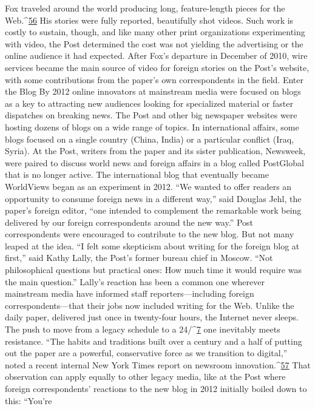 Fox traveled around the world producing long, feature-length pieces for the Web.^{\href{#endnotes}{56}} His
stories were fully reported, beautifully shot videos. Such work is costly to sustain,
though, and like many other print organizations experimenting with video, the Post
determined the cost was not yielding the advertising or the online audience it had
expected. After Fox’s departure in December of 2010, wire services became the main
source of video for foreign stories on the Post’s website, with some contributions from
the paper’s own correspondents in the field.
Enter the Blog
By 2012 online innovators at mainstream media were focused on blogs as a key to
attracting new audiences looking for specialized material or faster dispatches on breaking
news. The Post and other big newspaper websites were hosting dozens of blogs on a wide
range of topics. In international affairs, some blogs focused on a single country (China,
India) or a particular conflict (Iraq, Syria). At the Post, writers from the paper and its
sister publication, Newsweek, were paired to discuss world news and foreign affairs in a
blog called PostGlobal that is no longer active.
The international blog that eventually became WorldViews began as an experiment in
2012. ``We wanted to offer readers an opportunity to consume foreign news in a different
way,'' said Douglas Jehl, the paper’s foreign editor, ``one intended to complement the
remarkable work being delivered by our foreign correspondents around the new way.''
Post correspondents were encouraged to contribute to the new blog. But not many leaped
at the idea. ``I felt some skepticism about writing for the foreign blog at first,'' said Kathy
Lally, the Post’s former bureau chief in Moscow. ``Not philosophical questions but
practical ones: How much time it would require was the main question.''
Lally’s reaction has been a common one wherever mainstream media have informed staff
reporters—including foreign correspondents—that their jobs now included writing for the
Web. Unlike the daily paper, delivered just once in twenty-four hours, the Internet never
sleeps. The push to move from a legacy schedule to a 24/^{\href{#endnotes}{7}} one inevitably meets
resistance. ``The habits and traditions built over a century and a half of putting out the
paper are a powerful, conservative force as we transition to digital,'' noted a recent
internal New York Times report on newsroom innovation.^{\href{#endnotes}{57}}
That observation can apply equally to other legacy media, like at the Post where foreign
correspondents’ reactions to the new blog in 2012 initially boiled down to this: ``You’re
